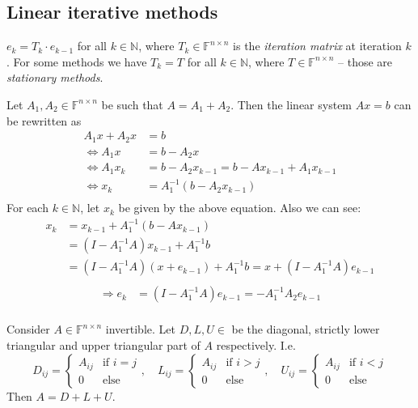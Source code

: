 \documentclass[12pt]{article}
\theoremstyle{definition}
\theoremstyle{remark}
\numberwithin{equation}{section}
\newcommand{\F}{\mathbb{F}}
\newcommand{\N}{\mathbb{N}}
\begin{document}
\subsection*{Linear iterative methods}
$e_k = T_k \cdot e_{k-1}$ for all $k \in \N$, where $T_k \in \F^{n \times n}$ is the \emph{iteration matrix} at iteration $k$. For some methods we have $T_k = T$ for all $k \in \N$, where $T \in \F^{n \times n}$ -- those are \emph{stationary methods}.

Let $A_1, A_2 \in \F^{n \times n}$ be such that $A=A_1 + A_2$. Then the linear system $Ax = b$ can be rewritten as
\begin{align*}
  A_1x + A_2x &= b \\
  \Leftrightarrow A_1x &= b - A_2x \\
  \Leftrightarrow A_1x_k &= b - A_2x_{k-1}  = b - Ax_{k-1} + A_1 x_{k-1}\\
  \Leftrightarrow x_k &= A_1^{-1}(b - A_2x_{k-1}) \\
\end{align*}
For each $k \in \N$, let $x_k$ be given by the above equation. Also we can see:
\begin{align*}
  x_k &= x_{k-1} + A_1^{-1}(b - Ax_{k-1}) \\
  &= (I-A_1^{-1}A)x_{k-1} + A_1^{-1}b \\
  &= (I - A_1^{-1}A)(x+e_{k-1}) + A_1^{-1}b = x + (I - A_1^{-1}A)e_{k-1} \\
\end{align*}
\begin{align*}
  \Rightarrow e_k &= (I - A_1^{-1}A)e_{k-1} = -A_1^{-1} A_2e_{k-1} \\
\end{align*}

Consider $A\in \F^{n\times n}$ invertible. Let $D,L,U \in$ be the diagonal, strictly lower triangular and upper triangular part of $A$ respectively. I.e.
\begin{equation*}
  D_{ij} =
  \begin{cases}
    A_{ij} & \text{if } i = j\\
    0 & \text{else}
  \end{cases},\quad L_{ij} =
  \begin{cases}
    A_{ij} & \text{if } i > j\\
    0 & \text{else}
  \end{cases},\quad U_{ij} =
  \begin{cases}
    A_{ij} & \text{if } i < j\\
    0 & \text{else}
  \end{cases}
\end{equation*}
Then $A = D + L + U$.
\end{document}
